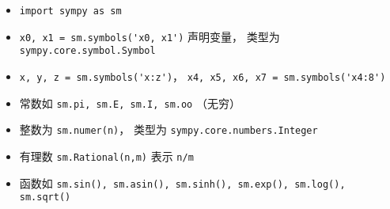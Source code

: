 
\begin{issues}
\issueDraft
\end{issues}


\begin{itemize}
\item \verb|import sympy as sm|
\item \verb|x0, x1 = sm.symbols('x0, x1')| 声明变量， 类型为 \verb|sympy.core.symbol.Symbol|
\item \verb|x, y, z = sm.symbols('x:z')|， \verb|x4, x5, x6, x7 = sm.symbols('x4:8')|
\item 常数如 \verb|sm.pi, sm.E, sm.I, sm.oo| （无穷）
\item 整数为 \verb|sm.numer(n)|， 类型为 \verb|sympy.core.numbers.Integer|
\item 有理数 \verb|sm.Rational(n,m)| 表示 \verb|n/m|
\item 函数如 \verb|sm.sin(), sm.asin(), sm.sinh(), sm.exp(), sm.log(), sm.sqrt()|
\end{itemize}
